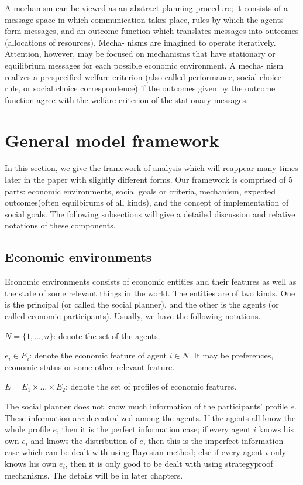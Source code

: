 A mechanism can be viewed as an abstract planning procedure; it consists of a message
space in which communication takes place, rules by which the agents form messages, and an
outcome function which translates messages into outcomes (allocations of resources). Mecha-
nisms are imagined to operate iteratively. Attention, however, may be focused on mechanisms
that have stationary or equilibrium messages for each possible economic environment. A mecha-
nism realizes a prespecified welfare criterion (also called performance, social choice rule, or social
choice correspondence) if the outcomes given by the outcome function agree with the welfare
criterion of the stationary messages. 

\section{General model framework}
 In this section, we give the framework of analysis which will
 reappear many times later in the paper with slightly different
 forms. Our framework is comprised of 5 parts: 
 economic environments, social goals or criteria,  mechanism, 
expected outcomes(often equilbirums of all kinds), and the concept of
implementation of social goals.
The following subsections will give a detailed discussion and relative
notations of these components.
\subsection{Economic environments}
Economic environments consists of economic entities and their features
as well as the state of some relevant things in the world. The
entities are of two kinds. One is the principal (or called the social
planner),  and the other is  the agents (or called economic
participants).  Usually, we have the following notations.

$N=\{1,...,n\}$: denote the set of the agents.

$e_i\in E_i$: denote the economic feature of agent $i\in N$. It may be preferences, economic status or some other relevant feature.

$E=E_1\times \dots \times E_2$: denote the set of profiles of economic features.

 The social planner does not know much information of
the participants' profile $e$. These information are decentralized
among the agents. 
If the agents all know the whole profile $e$, then it is the perfect information case; if every agent $i$ knows his own $e_i$ and knows the distribution of $e$, then this is the imperfect information case which can be dealt with using Bayesian method; else if every agent $i$ only knows his own $e_i$, then it is only good to be dealt with using strategyproof mechanisms. The details will be in later chapters.

